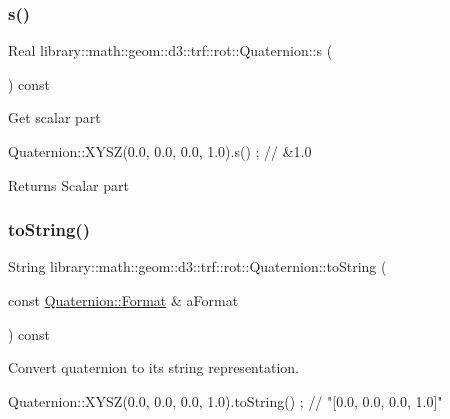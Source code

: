 \subsubsection{\texorpdfstring{s()}{s()}}
{\footnotesize\ttfamily Real library\+::math\+::geom\+::d3\+::trf\+::rot\+::\+Quaternion\+::s (\begin{DoxyParamCaption}{ }\end{DoxyParamCaption}) const}

Get scalar part


\begin{DoxyCode}
Quaternion::XYSZ(0.0, 0.0, 0.0, 1.0).s() ; \textcolor{comment}{// &1.0}
\end{DoxyCode}


\begin{DoxyReturn}{Returns}
Scalar part 
\end{DoxyReturn}
\mbox{\label{classlibrary_1_1math_1_1geom_1_1d3_1_1trf_1_1rot_1_1_quaternion_a92e9e07e4edb3cc77c308ec7f5888515}} 
\subsubsection{\texorpdfstring{to\+String()}{toString()}\hspace{0.1cm}{\footnotesize\ttfamily [1/2]}}
{\footnotesize\ttfamily String library\+::math\+::geom\+::d3\+::trf\+::rot\+::\+Quaternion\+::to\+String (\begin{DoxyParamCaption}\item[{const \hyperlink{classlibrary_1_1math_1_1geom_1_1d3_1_1trf_1_1rot_1_1_quaternion_aa86c54f6157891b2f1a517c672d6deec}{Quaternion\+::\+Format} \&}]{a\+Format }\end{DoxyParamCaption}) const}



Convert quaternion to its string representation. 


\begin{DoxyCode}
Quaternion::XYSZ(0.0, 0.0, 0.0, 1.0).toString() ; \textcolor{comment}{// "[0.0, 0.0, 0.0, 1.0]"}
\end{DoxyCode}



